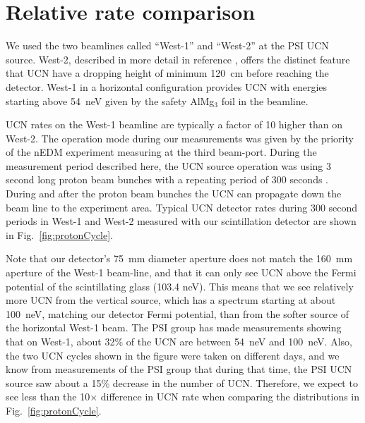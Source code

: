 \documentclass[letter,twocolumn,preprint,3p,numbers,sort&compress]{elsarticle}
\begin{document}
\section{ Relative rate comparison }\label{sec:relative}

We used the two beamlines called ``West-1'' and ``West-2'' at the PSI
UCN source\cite{ucnBeam}.  West-2, described in more detail in
reference \cite{ucnBeam}, offers the distinct feature that UCN have a
dropping height of minimum 120~cm before reaching the detector.
West-1 in a horizontal configuration provides UCN with energies
starting above 54~neV given by the safety AlMg$_3$ foil in the
beamline.  

UCN rates on the West-1 beamline are typically a factor of 10 higher
than on West-2.  The operation mode during our measurements was given
by the priority of the nEDM experiment measuring at the third
beam-port.  During the measurement period described here, the UCN
source operation was using 3 second long proton beam bunches with a
repeating period of 300 seconds .  During and after the proton beam
bunches the UCN can propagate down the beam line to the experiment
area.  Typical UCN detector rates during 300 second periods in West-1
and West-2 measured with our scintillation detector are shown in
Fig.~\ref{fig:protonCycle}.

Note that our detector's 75~mm diameter aperture does not match the
160~mm aperture of the West-1 beam-line, and that it can only see UCN
above the Fermi potential of the scintillating glass (103.4 neV).
This means that we see relatively more UCN from the vertical source,
which has a spectrum starting at about 100~neV, matching our detector
Fermi potential, than from the softer source of the horizontal West-1
beam.  The PSI group has made measurements showing that on West-1,
about 32\% of the UCN are between 54~neV and 100~neV.  Also, the two
UCN cycles shown in the figure were taken on different days, and we
know from measurements of the PSI group that during that time, the PSI
UCN source saw about a 15\% decrease in the number of UCN.  Therefore,
we expect to see less than the 10$\times$ difference in UCN rate when
comparing the distributions in Fig.~\ref{fig:protonCycle}.
\end{document}
